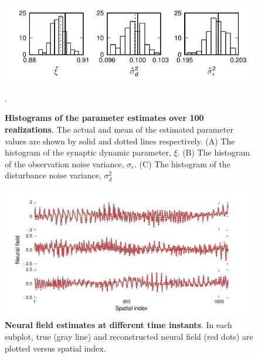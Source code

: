 \documentclass[]{article}
\begin{document}
\begin{figure}[!ht]
\begin{center}
\includegraphics{./Figures/Histogram.pdf}
\end{center}
\caption{{\bf Histograms of the parameter estimates over 100 realizations}. The actual and mean of the estimated parameter values are shown by solid and dotted lines respectively. (A) The histogram of the synaptic dynamic parameter, $\xi$. (B) The histogram of the observation noise variance, $\sigma_{\epsilon}$. (C) The histogram of the disturbance noise variance, $\sigma_d^2$}.
\label{fig:Histogram}
\end{figure}
\begin{figure}[!ht]
\begin{center}
\includegraphics[scale=1]{./Figures/FieldEstimates.pdf}
\end{center}
\caption{{\bf Neural field estimates at different time instants}. In each subplot, true (gray line) and reconstructed neural field (red dots) are plotted versus spatial index.}
\label{fig:FieldEstimates}
\end{figure}
\end{document}
